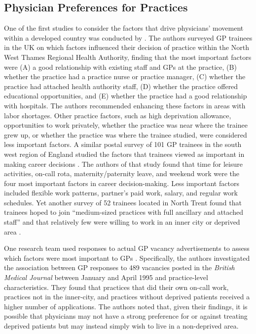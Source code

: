 \documentclass[12pt]{article}
\begin{document}
\subsection{Physician Preferences for Practices}

One of the first studies to consider the factors that drive physicians' movement within a developed country was conducted by \citet{beardowFactorsInfluencingCareer1993}. The authors surveyed GP trainees in the UK on which factors influenced their decision of practice within the North West Thames Regional Health Authority, finding that the most important factors were (A) a good relationship with existing staff and GPs at the practice, (B) whether the practice had a practice nurse or practice manager, (C) whether the practice had attached health authority staff, (D) whether the practice offered educational opportunities, and (E) whether the practice had a good relationship with hospitals. The authors recommended enhancing these factors in areas with labor shortages. Other practice factors, such as high deprivation allowance, opportunities to work privately, whether the practice was near where the trainee grew up, or whether the practice was where the trainee studied, were considered less important factors. A similar postal survey of 101 GP trainees in the south west region of England studied the factors that trainees viewed as important in making career decisions \citep{rowsellGeneralPractitionerRegistrars1995}. The authors of that study found that time for leisure activities, on-call rota, maternity/paternity leave, and weekend work were the four most important factors in career decision-making. Less important factors included flexible work patterns, partner's paid work, salary, and regular work schedules. Yet another survey of 52 trainees located in North Trent found that trainees hoped to join ``medium-sized practices with full ancillary and attached staff'' and that relatively few were willing to work in an inner city or deprived area \citep{webbCareerChoicesTrainees1996}.

One research team used responses to actual GP vacancy advertisements to assess which factors were most important to GPs \citep{carlisleFactorsInfluencingResponse1996}. Specifically, the authors investigated the association between GP responses to 489 vacancies posted in the \emph{British Medical Journal} between January and April 1995 and practice-level characteristics. They found that practices that did their own on-call work, practices not in the inner-city, and practices without deprived patients received a higher number of applications. The authors noted that, given their findings, it is possible that physicians may not have a strong preference for or against treating deprived patients but may instead simply wish to live in a non-deprived area.
\end{document}
